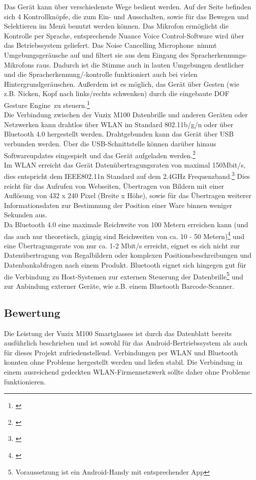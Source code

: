 Das Gerät kann über verschiedenste Wege bedient werden. Auf der Seite befinden sich 4 Kontrollknöpfe, die zum Ein- und Ausschalten, sowie für das Bewegen und Selektieren im Menü benutzt werden können. Das Mikrofon ermöglicht die Kontrolle per Sprache, entsprechende \glqq Nuance Voice Control\grqq -Software wird über das Betriebssystem geliefert. Das \glqq Noise Cancelling Microphone\grqq\ nimmt Umgebungsgeräusche auf und filtert sie aus dem Eingang des Spracherkennungs-Mikrofons raus. Dadurch ist die Stimme auch in lauten Umgebungen deutlicher und die Spracherkennung/-kontrolle funktioniert auch bei vielen Hintergrundgeräuschen. Außerdem ist es möglich, das Gerät über Gesten (wie z.B. Nicken, Kopf nach links/rechts schwenken) durch die eingebaute  DOF Gesture Engine\grqq\ zu steuern.\footnote{\citep{vuzixm100}}\\

Die Verbindung zwischen der Vuzix M100 Datenbrille und anderen Geräten oder Netzwerken kann drahtlos über WLAN im Standard 802.11b/g/n oder über Bluetooth 4.0 hergestellt werden. Drahtgebunden kann das Gerät über \ac{USB} verbunden werden. Über die \ac{USB}-Schnittstelle können darüber hinaus Softwareupdates eingespielt und das Gerät aufgeladen werden.\footnote{\citep{vuzixm100}}\\
Im \ac{WLAN} erreicht das Gerät Datenübertragungsraten von maximal 150Mbit/s, dies entspricht dem IEEE802.11n Standard auf dem 2.4GHz Frequenzband.\footnote{\citep{uebertragungsgeschwindigkeit}} Dies reicht für das Aufrufen von Webseiten, Übertragen von Bildern mit einer Auflösung von 432 x 240 Pixel (Breite x Höhe), sowie für das Übertragen weiterer Informationsdaten zur Bestimmung der Position einer Ware binnen weniger Sekunden aus.\\
Da Bluetooth 4.0 eine maximale Reichweite von 100 Metern erreichen kann (und das auch nur theoretisch, gängig sind Reichweiten von ca. 10 - 50 Metern)\footnote{\citep{bluetooth}} und eine Übertragungsrate von nur ca. 1-2 Mbit/s erreicht, eignet es sich nicht zur Datenübertragung von Regalbildern oder komplexen Positionsbeschreibungen und Datenbankabfragen nach einem Produkt. Bluetooth eignet sich hingegen gut für die Verbindung zu Host-Systemen zur externen Steuerung der Datenbrille\footnote{Voraussetzung ist ein Android-Handy mit entsprechender App} und zur Anbindung externer Geräte, wie z.B. einem Bluetooth Barcode-Scanner.

\subsection{Bewertung}
Die Leistung der Vuzix M100 Smartglasses ist durch das Datenblatt bereits ausführlich beschrieben und ist sowohl für das Android-Bertriebssystem als auch für dieses Projekt zufriedenstellend. Verbindungen per \ac{WLAN} und Bluetooth konnten ohne Probleme hergestellt werden und liefen stabil. Die Verbindung in einem ausreichend gedeckten \ac{WLAN}-Firmennetzwerk sollte daher ohne Probleme funktionieren.\\

